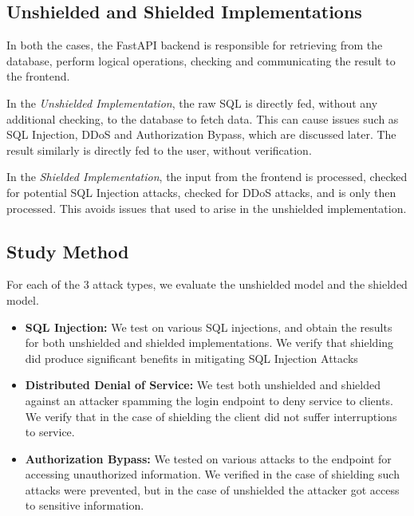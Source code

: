 \documentclass[11pt,a4paper]{article}
\begin{document}
\subsection{Unshielded and Shielded Implementations}

In both the cases, the FastAPI backend is responsible for retrieving from the database, perform logical operations, checking and communicating the result to the frontend.

In the \textit{Unshielded Implementation}, the raw SQL is directly fed, without any additional checking, to the database to fetch data. This can cause issues such as SQL Injection, DDoS and Authorization Bypass, which are discussed later. The result similarly is directly fed to the user, without verification.

In the \textit{Shielded Implementation}, the input from the frontend is processed, checked for potential SQL Injection attacks, checked for DDoS attacks, and is only then processed. This avoids issues that used to arise in the unshielded implementation.

\subsection{Study Method}

For each of the 3 attack types, we evaluate the unshielded model and the shielded model.

\begin{itemize}
    \item \textbf{SQL Injection:} We test on various SQL injections, and obtain the results for both unshielded and shielded implementations. We verify that shielding did produce significant benefits in mitigating SQL Injection Attacks
    \item \textbf{Distributed Denial of Service:} We test both unshielded and shielded against an attacker spamming the login endpoint to deny service to clients. We verify that in the case of shielding the client did not suffer interruptions to service.
    \item \textbf{Authorization Bypass:} We tested on various attacks to the endpoint for accessing unauthorized information. We verified in the case of shielding such attacks were prevented, but in the case of unshielded the attacker got access to sensitive information. 
\end{itemize}
\end{document}
